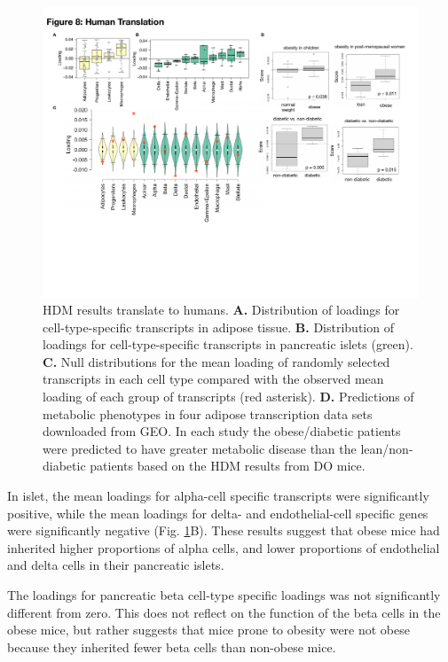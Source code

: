 \documentclass[
]{article}
\begin{document}
\begin{figure}[ht!]
\includegraphics[width=\textwidth]{Figures/Fig8_Human_Translation.pdf} 
\caption{HDM results translate to humans. \textbf{A.} Distribution of 
loadings for cell-type-specific transcripts in adipose tissue. \textbf{B.} 
Distribution of loadings for cell-type-specific transcripts in pancreatic 
islets (green). \textbf{C.} Null distributions for the mean loading of 
randomly selected transcripts in each cell type compared with the observed 
mean loading of each group of transcripts (red asterisk). \textbf{D.} 
Predictions of metabolic phenotypes in four adipose transcription data 
sets downloaded from GEO. In each study the obese/diabetic patients were 
predicted to have greater metabolic disease than the lean/non-diabetic 
patients based on the HDM results from DO mice.
}
\label{fig:human_translation}
\end{figure}

In islet, the mean loadings for alpha-cell specific transcripts were
significantly positive, while the mean loadings for delta- and
endothelial-cell specific genes were significantly negative (Fig.
\ref{fig:human_translation}B). These results suggest that obese mice had
inherited higher proportions of alpha cells, and lower proportions of
endothelial and delta cells in their pancreatic islets.

The loadings for pancreatic beta cell-type specific loadings was not
significantly different from zero. This does not reflect on the function
of the beta cells in the obese mice, but rather suggests that mice prone
to obesity were not obese because they inherited fewer beta cells than
non-obese mice.
\end{document}
